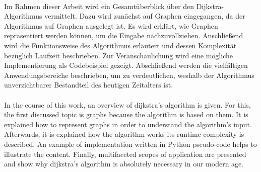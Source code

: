 \kurzfassung

\paragraph*{}


Im Rahmen dieser Arbeit wird ein Gesamtüberblick über den Dijkstra-Algorithmus vermittelt.
Dazu wird zunächst auf Graphen eingegangen, da der Algorithmus auf Graphen ausgelegt ist. Es wird erklärt, wie Graphen repräsentiert werden können, um die Eingabe nachzuvollziehen.
Anschließend wird die Funktionsweise des Algorithmus erläutert und dessen Komplexität bezüglich Laufzeit  beschrieben. Zur Veranschaulichung wird eine mögliche Implementierung als Codebeispiel gezeigt.
Abschließend werden die vielfältigen Anwendungsbereiche beschrieben, um zu verdeutlichen, weshalb der Algorithmus unverzichtbarer Bestandteil des heutigen Zeitalters ist. \\ \\

In the course of this work, an overview of dijkstra's algorithm is given.
For this, the first discussed topic is graphs because the algorithm is based on them. It is explained how to represent graphs in order to understand the algorithm's input.
Afterwards, it is explained how the algorithm works its runtime complexity is described. An example of implementation written in Python pseudo-code helps to illustrate the content.
Finally, multifaceted scopes of application are presented and show why dijkstra's algorithm is absolutely necessary in our modern age.
